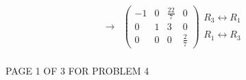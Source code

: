 \documentclass[12pt]{article}
\newenvironment{problem}[2][Problem]
{
	\begin{trivlist} 
		\item[\hskip \labelsep {\bfseries #1 #2:}]
	}
{
	\end{trivlist}
	}
\newenvironment{solution}[1][Solution]
{
	\begin{trivlist} 
		\item[\hskip \labelsep {\itshape #1:}]
	}
	{
	\end{trivlist}
}
\begin{document}
\begin{problem}{4}
\begin{solution}
\begin{align*}
\rightarrow& \begin{pmatrix} -1&0&\frac{22}{7}&0\\0&1&3&0\\0&0&0&\frac{2}{7} \end{pmatrix} \begin{matrix} R_3 \leftrightarrow R_1 \text{ } \\ \text{ } \\ R_1 \leftrightarrow R_3 \text{ } \end{matrix}\\
\end{align*}
\end{solution}
\end{problem}
\vfill
\centerline{PAGE 1 OF 3 FOR PROBLEM 4}
\end{document}
